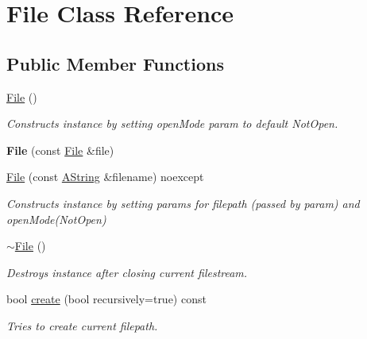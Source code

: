 \hypertarget{class_file}{}\section{File Class Reference}
\label{class_file}
\subsection*{Public Member Functions}
\begin{DoxyCompactItemize}
\item 
\mbox{\label{class_file_ae039af5807fc385f41b60644725d15d0}} 
\mbox{\hyperlink{class_file_ae039af5807fc385f41b60644725d15d0}{File}} ()
\begin{DoxyCompactList}\small\item\em Constructs instance by setting open\+Mode param to default Not\+Open. \end{DoxyCompactList}\item 
\mbox{\label{class_file_a59bf1e7bb0c6b8dd83dccef6b942a0f9}} 
{\bfseries File} (const \mbox{\hyperlink{class_file}{File}} \&file)
\item 
\mbox{\hyperlink{class_file_acdd8c37d2cac9e9e9a43b34923aa0c97}{File}} (const \mbox{\hyperlink{class_a_string}{A\+String}} \&filename) noexcept
\begin{DoxyCompactList}\small\item\em Constructs instance by setting params for filepath (passed by param) and open\+Mode(\+Not\+Open) \end{DoxyCompactList}\item 
\mbox{\label{class_file_ac704ebdf5f57d7a1c5ddf409d797fb69}} 
\mbox{\hyperlink{class_file_ac704ebdf5f57d7a1c5ddf409d797fb69}{$\sim$\+File}} ()
\begin{DoxyCompactList}\small\item\em Destroys instance after closing current filestream. \end{DoxyCompactList}\item 
bool \mbox{\hyperlink{class_file_a208b0649e571a157d00dd91c6927d4be}{create}} (bool recursively=true) const
\begin{DoxyCompactList}\small\item\em Tries to create current filepath. \end{DoxyCompactList}\item 

\end{DoxyCompactItemize}
